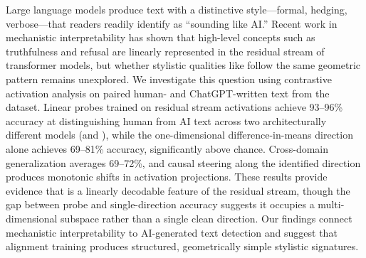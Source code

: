 Large language models produce text with a distinctive style---formal, hedging, verbose---that readers readily identify as ``sounding like AI.''
Recent work in mechanistic interpretability has shown that high-level concepts such as truthfulness and refusal are linearly represented in the residual stream of transformer models, but whether stylistic qualities like \aistyle follow the same geometric pattern remains unexplored.
We investigate this question using contrastive activation analysis on paired human- and ChatGPT-written text from the \hcthree dataset.
Linear probes trained on residual stream activations achieve 93--96\% accuracy at distinguishing human from AI text across two architecturally different models (\pythia and \qwen), while the one-dimensional difference-in-means direction alone achieves 69--81\% accuracy, significantly above chance.
Cross-domain generalization averages 69--72\%, and causal steering along the identified direction produces monotonic shifts in activation projections.
These results provide evidence that \aistyle is a linearly decodable feature of the residual stream, though the gap between probe and single-direction accuracy suggests it occupies a multi-dimensional subspace rather than a single clean direction.
Our findings connect mechanistic interpretability to AI-generated text detection and suggest that alignment training produces structured, geometrically simple stylistic signatures.
